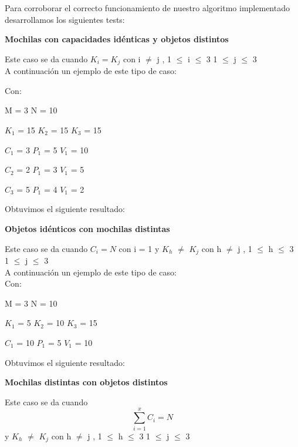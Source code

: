 \indent Para corroborar el correcto funcionamiento de nuestro algoritmo implementado desarrollamos los siguientes tests:\\


\begin{center}
 \textbf{Mochilas con capacidades id\'enticas y objetos distintos}
\end{center}

Este caso se da cuando $K_{i} = K_{j}$ con i $\neq$ j , 1 $\leq$ i $\leq$ 3  1 $\leq$ j $\leq$ 3  \\

A continuaci\'on un ejemplo de este tipo de caso:

Con:

M = 3 N = 10

$K_{1}$ = 15  $K_{2}$ = 15  $K_{3}$ = 15 

$C_{1}$ = 3 $P_{1}$ = 5 $V_{1}$ = 10

$C_{2}$ = 2 $P_{1}$ = 3 $V_{1}$ = 5

$C_{3}$ = 5 $P_{1}$ = 4 $V_{1}$ = 2
  
  \indent  
  
  Obtuvimos el siguiente resultado:\\


\begin{center}
 \textbf{Objetos id\'enticos con mochilas distintas}
\end{center}

Este caso se da cuando $C_{i} = N$ con i = 1 y $K_{h}$ $\neq$ $K_{j}$ con h $\neq$ j , 1 $\leq$ h $\leq$ 3  1 $\leq$ j $\leq$ 3 \\

A continuaci\'on un ejemplo de este tipo de caso:\\

 Con:
 
 M = 3 N = 10
 
 $K_{1}$ = 5  $K_{2}$ = 10  $K_{3}$ = 15
 
 $C_{1}$ = 10 $P_{1}$ = 5 $V_{1}$ = 10
  
  \indent  
  
  Obtuvimos el siguiente resultado:\\


\begin{center}
 \textbf{Mochilas distintas con objetos distintos}
\end{center}

Este caso se da cuando \[
\sum_{i=1}^{x}C_{i}=N 
\]  y $K_{h}$ $\neq$ $K_{j}$ con h $\neq$ j , 1 $\leq$ h $\leq$ 3  1 $\leq$ j $\leq$ 3 \\

